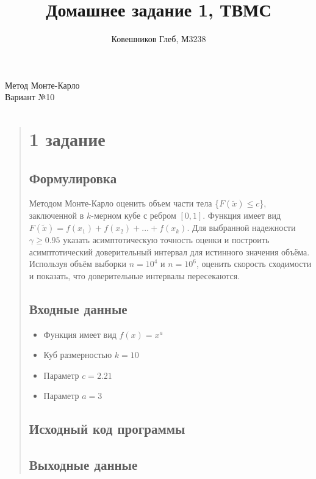 \documentclass{article}
\begin{document}
\title{Домашнее задание 1, ТВМС}
\author{Ковешников Глеб, М3238}
\maketitle
\begin{center}
    Метод Монте-Карло \\
    Вариант №10
\end{center}

\begin{quote}
\section{1 задание}
\subsection{Формулировка}
        Методом Монте-Карло оценить объем части тела \{$F(\tilde x) \leq c$\}, заключенной в $k$-мерном кубе с ребром $[0, 1]$. 
        Функция имеет вид $F(\tilde x) = f(x_1) + f(x_2) + ... + f(x_k)$.
        Для выбранной надежности $\gamma \geq 0.95$ указать асимптотическую точность оценки и построить асимптотический доверительный интервал для истинного значения объёма. \\
        Используя объём выборки $n = 10^4$ и $n = 10^6$, оценить скорость сходимости и показать, что доверительные интервалы пересекаются.
\subsection{Входные данные}
        \begin{itemize}
            \item Функция имеет вид $f(x) = x^a$
            \item Куб размерностью $k = 10$
            \item Параметр $c = 2.21$ 
	    \item Параметр $a = 3$
        \end{itemize}
\subsection{Исходный код программы}
        \begin{minipage}{\linewidth}
            
        \end{minipage}
\subsection{Выходные данные}
	\begin{minipage}{\linewidth}
            
        \end{minipage}

\end{quote}
\end{document}
